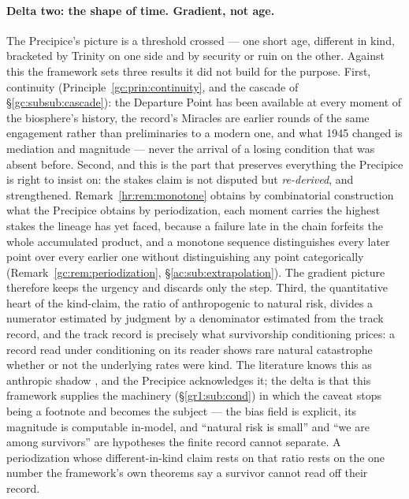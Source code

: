 \documentclass[11pt]{article}
\numberwithin{equation}{section}
\theoremstyle{plain}
\theoremstyle{definition}
\theoremstyle{remark}
\begin{document}
\paragraph{Delta two: the shape of time. Gradient, not age.} The
Precipice's picture is a threshold crossed --- one short age, different
in kind, bracketed by Trinity on one side and by security or ruin on
the other. Against this the framework sets three results it did not
build for the purpose. First, continuity
(Principle~\ref{gc:prin:continuity}, and the cascade of
\S\ref{gc:subsub:cascade}): the Departure Point has been available at
every moment of the biosphere's history, the record's Miracles are
earlier rounds of the same engagement rather than preliminaries to a
modern one, and what 1945 changed is mediation and magnitude ---
never the arrival of a losing condition that was absent before.
Second, and this is the part that preserves everything the Precipice
is right to insist on: the stakes claim is not disputed but
\emph{re-derived}, and strengthened. Remark~\ref{hr:rem:monotone}
obtains by combinatorial construction what the Precipice obtains by
periodization, each moment carries the highest stakes the lineage
has yet faced, because a failure late in the chain forfeits the whole
accumulated product, and a monotone sequence distinguishes every
later point over every earlier one without distinguishing any point
categorically (Remark~\ref{gc:rem:periodization},
\S\ref{ac:sub:extrapolation}). The gradient picture therefore keeps
the urgency and discards only the step. Third, the quantitative heart
of the kind-claim, the ratio of anthropogenic to natural risk, divides a numerator estimated by judgment by a denominator estimated
from the track record, and the track record is precisely what
survivorship conditioning prices: a record read under conditioning on
its reader shows rare natural catastrophe whether or not the
underlying rates were kind. The literature knows this as anthropic
shadow \cite{CSB10}, and the Precipice acknowledges it; the delta is
that this framework supplies the machinery
(\S\ref{gr1:sub:cond}) in which the caveat stops being a footnote and
becomes the subject --- the bias field is explicit, its magnitude is
computable in-model, and ``natural risk is small'' and ``we are among
survivors'' are hypotheses the finite record cannot separate. A
periodization whose different-in-kind claim rests on that ratio rests
on the one number the framework's own theorems say a survivor cannot
read off their record.
\end{document}
